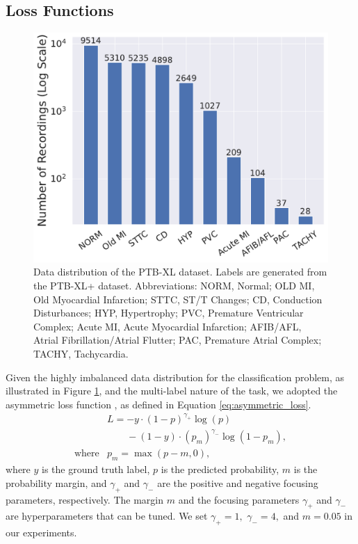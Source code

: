 \subsection{Loss Functions}
\label{subsec:loss_functions}


\begin{figure}[!htp]
\centering
\includegraphics[width=\linewidth]{images/data_distribution.pdf}
\caption{Data distribution of the PTB-XL dataset. Labels are generated from the PTB-XL+ dataset. Abbreviations: NORM, Normal; OLD MI, Old Myocardial Infarction; STTC, ST/T Changes; CD, Conduction Disturbances; HYP, Hypertrophy; PVC, Premature Ventricular Complex; Acute MI, Acute Myocardial Infarction; AFIB/AFL, Atrial Fibrillation/Atrial Flutter; PAC, Premature Atrial Complex; TACHY, Tachycardia.}
\label{fig:data-distribution}
\end{figure}

Given the highly imbalanced data distribution for the classification problem, as illustrated in Figure \ref{fig:data-distribution}, and the multi-label nature of the task, we adopted the asymmetric loss function \cite{ridnik2021asymmetric_loss}, as defined in Equation \eqref{eq:asymmetric_loss}.
\begin{equation}
\label{eq:asymmetric_loss}
\begin{array}{ll}
& L = -y \cdot (1-p)^{\gamma_{+}} \log(p) \\
& \phantom{L = } - (1-y) \cdot (p_m)^{\gamma_{-}} \log(1-p_m), \\
\text{where} & p_m = \max(p - m, 0),
\end{array}
\end{equation}
where $y$ is the ground truth label, $p$ is the predicted probability, $m$ is the probability margin, and $\gamma_{+}$ and $\gamma_{-}$ are the positive and negative focusing parameters, respectively. The margin $m$ and the focusing parameters $\gamma_{+}$ and $\gamma_{-}$ are hyperparameters that can be tuned. We set $\gamma_{+} = 1,$ $\gamma_{-} = 4,$ and $m = 0.05$ in our experiments.

